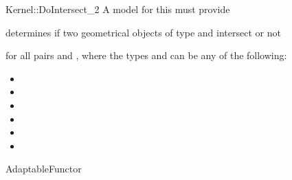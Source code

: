 \begin{ccRefFunctionObjectConcept}{Kernel::DoIntersect_2}
A model for this must provide


{determines if two geometrical objects of type 
 and  intersect or not}

for all pairs  and , where
the types  and  can be any of the
following:
\begin{itemize}
\item {}
\item {}
\item {}
\item {}
\item {}
\item {}
\end{itemize}

\ccRefines
AdaptableFunctor

\ccSeeAlso
{}\\

\end{ccRefFunctionObjectConcept}
